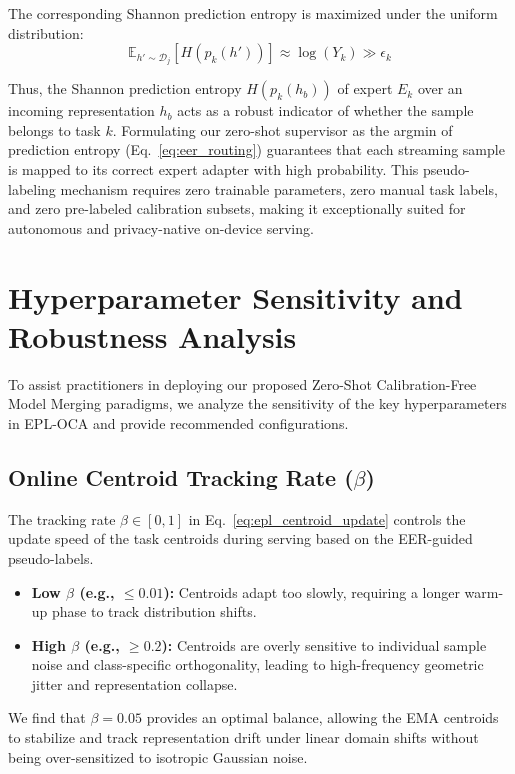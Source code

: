 \documentclass{article}
\theoremstyle{plain}
\theoremstyle{definition}
\theoremstyle{remark}
\begin{document}
The corresponding Shannon prediction entropy is maximized under the uniform distribution:
\begin{equation}
\mathbb{E}_{h' \sim \mathcal{D}_j}[H(p_k(h'))] \approx \log(Y_k) \gg \epsilon_k
\end{equation}

Thus, the Shannon prediction entropy $H(p_k(h_b))$ of expert $E_k$ over an incoming representation $h_b$ acts as a robust indicator of whether the sample belongs to task $k$. Formulating our zero-shot supervisor as the argmin of prediction entropy (Eq.~\ref{eq:eer_routing}) guarantees that each streaming sample is mapped to its correct expert adapter with high probability. This pseudo-labeling mechanism requires zero trainable parameters, zero manual task labels, and zero pre-labeled calibration subsets, making it exceptionally suited for autonomous and privacy-native on-device serving.

\section{Hyperparameter Sensitivity and Robustness Analysis}
\label{app:hyperparameters}

To assist practitioners in deploying our proposed Zero-Shot Calibration-Free Model Merging paradigms, we analyze the sensitivity of the key hyperparameters in EPL-OCA and provide recommended configurations.

\subsection{Online Centroid Tracking Rate ($\beta$)}
The tracking rate $\beta \in [0, 1]$ in Eq.~\ref{eq:epl_centroid_update} controls the update speed of the task centroids during serving based on the EER-guided pseudo-labels.
\begin{itemize}
    \item \textbf{Low $\beta$ (e.g., $\le 0.01$):} Centroids adapt too slowly, requiring a longer warm-up phase to track distribution shifts.
    \item \textbf{High $\beta$ (e.g., $\ge 0.2$):} Centroids are overly sensitive to individual sample noise and class-specific orthogonality, leading to high-frequency geometric jitter and representation collapse.
\end{itemize}
We find that $\beta = 0.05$ provides an optimal balance, allowing the EMA centroids to stabilize and track representation drift under linear domain shifts without being over-sensitized to isotropic Gaussian noise.
\end{document}
